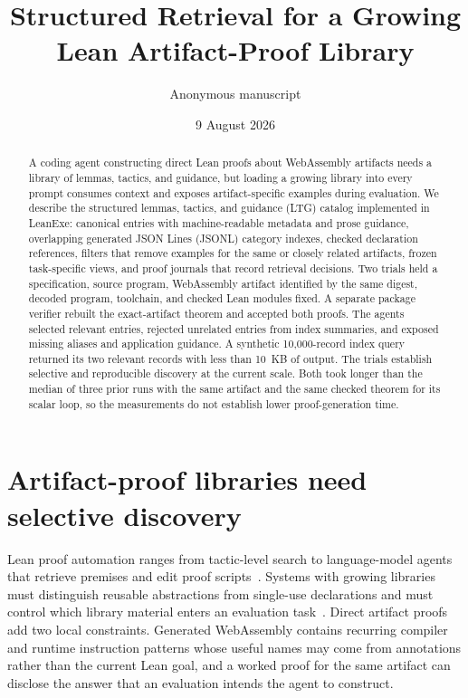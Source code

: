 \documentclass[10pt]{article}
\title{Structured Retrieval for a Growing Lean Artifact-Proof Library}
\author{Anonymous manuscript}
\date{9 August 2026}
\begin{document}
\maketitle

\begin{abstract}
A coding agent constructing direct Lean proofs about WebAssembly artifacts needs a library of lemmas, tactics, and guidance, but loading a growing library into every prompt consumes context and exposes \mbox{artifact-specific} examples during evaluation.  We describe the structured lemmas, tactics, and guidance (LTG) catalog implemented in LeanExe: canonical entries with machine-readable metadata and prose guidance, overlapping generated JSON Lines (JSONL) category indexes, checked declaration references, filters that remove examples for the same or closely related artifacts, frozen \mbox{task-specific} views, and proof journals that record retrieval decisions.  Two trials held a specification, source program, WebAssembly artifact identified by the same digest, decoded program, toolchain, and checked Lean modules fixed.  A separate package verifier rebuilt the exact-artifact theorem and accepted both proofs.  The agents selected relevant entries, rejected unrelated entries from index summaries, and exposed missing aliases and application guidance.  A synthetic 10,000-record index query returned its two relevant records with less than 10~KB of output.  The trials establish selective and reproducible discovery at the current scale.  Both took longer than the median of three prior runs with the same artifact and the same checked theorem for its scalar loop, so the measurements do not establish lower proof-generation time.
\end{abstract}

\section{Artifact-proof libraries need selective discovery}

Lean proof automation ranges from tactic-level search to language-model agents that retrieve premises and edit proof scripts~\cite{Limperg2023Aesop,Yang2023LeanDojo,Thakur2024COPRA}.  Systems with growing libraries must distinguish reusable abstractions from single-use declarations and must control which library material enters an evaluation task~\cite{Wang2024LEGOProver,BerlotAttwell2024LibraryLearning}.  Direct artifact proofs add two local constraints.  Generated WebAssembly contains recurring compiler and runtime instruction patterns whose useful names may come from annotations rather than the current Lean goal, and a worked proof for the same artifact can disclose the answer that an evaluation intends the agent to construct.
\end{document}
